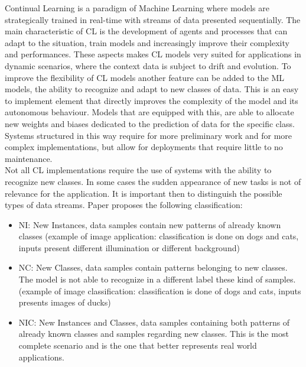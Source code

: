 \documentclass[12pt]{report}
\begin{document}
Continual Learning is a paradigm of Machine Learning where models are strategically trained in real-time with streams of data presented sequentially. The main characteristic of CL is the development of agents and processes that can adapt to the situation, train models and increasingly improve their complexity and performances. These aspects makes CL models very suited for applications in dynamic scenarios, where the context data is subject to drift and evolution. To improve the flexibility of CL models another feature can be added to the ML models, the ability to recognize and adapt to new classes of data. This is an easy to implement element that directly improves the complexity of the model and its autonomous behaviour. Models that are equipped with this, are able to allocate new weights and biases dedicated to the prediction of data for the specific class. Systems structured in this way require for more preliminary work and for more complex implementations, but allow for deployments that require little to no maintenance. \\
Not all CL implementations require the use of systems with the ability to recognize new classes. In some cases the sudden appearance of new tasks is not of relevance for the application. It is important then to distinguish the possible types of data streams. Paper \cite{maltoni2019continuous} proposes the following classification:\\

\begin{itemize}
\item NI: New Instances, data samples contain new patterns of already known classes (example of image application: classification is done on dogs and cats, inputs present different illumination or different background)
\item NC: New Classes, data samples contain patterns belonging to new classes. The model is not able to recognize in a different label these kind of samples. (example of image classification: classification is done of dogs and cats, inputs presents images of ducks)
\item NIC: New Instances and Classes, data samples containing both patterns of already known classes and samples regarding new classes. This is the most complete scenario and is the one that better represents real world applications.
\end{itemize}
\end{document}
